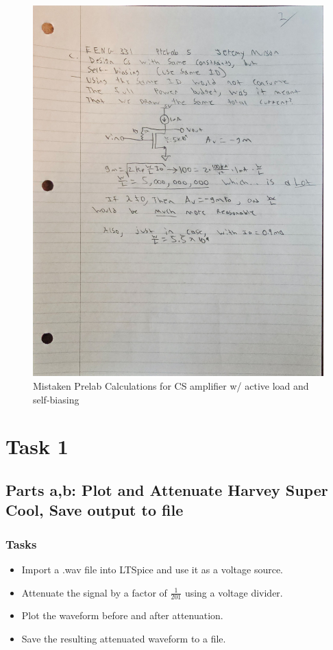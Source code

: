 \documentclass[11pt]{article}
\begin{document}
	\begin{figure}
	\centering
		\includegraphics[width=0.95\linewidth]{prelab2}
		\caption{Mistaken Prelab Calculations for CS amplifier w/ active load and self-biasing}
		\label{fig:prelab2}
	\end{figure}

\FloatBarrier

	\section{Task 1}
	
	\subsection{Parts a,b: Plot and Attenuate Harvey Super Cool, Save output to file}
	
		\subsubsection{Tasks}
		\begin{itemize}
			\item Import a .wav file into LTSpice and use it as a voltage source.
			\item Attenuate the signal by a factor of $\frac{1}{201}$ using a voltage divider. 
			\item Plot the waveform before and after attenuation.
			\item Save the resulting attenuated waveform to a file.
		\end{itemize}
	
\end{document}
